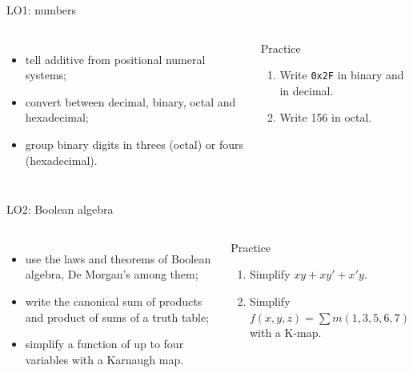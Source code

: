 \documentclass[10pt]{wosm-slides}
\begin{document}
\begin{frame}{LO1: numbers}
  \begin{columns}[T, totalwidth=\textwidth]
      \begin{itemize}
        \item tell additive from positional numeral systems;
        \item convert between decimal, binary, octal and hexadecimal;
        \item group binary digits in threes (octal) or fours (hexadecimal).
      \end{itemize}
      \begin{block}{Practice}
        \begin{enumerate}
          \item Write \texttt{0x2F} in binary and in decimal.\par
          \item Write 156 in octal.\par
        \end{enumerate}
      \end{block}
  \end{columns}
\end{frame}

\begin{frame}{LO2: Boolean algebra}
  \begin{columns}[T, totalwidth=\textwidth]
      \begin{itemize}
        \item use the laws and theorems of Boolean algebra, De Morgan's among them;
        \item write the canonical sum of products and product of sums of a truth
          table;
        \item simplify a function of up to four variables with a Karnaugh map.
      \end{itemize}
      \begin{block}{Practice}
        \begin{enumerate}
          \item Simplify $x y + x y' + x' y$.\par
          \item Simplify $f(x, y, z) = \sum m(1, 3, 5, 6, 7)$ with a K-map.\par
        \end{enumerate}
      \end{block}
  \end{columns}
\end{frame}
\end{document}

